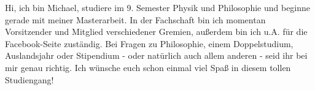 \begin{multicols*}{2}
{Hi, ich bin Michael, studiere im 9. Semester Physik und Philosophie und beginne gerade mit meiner Masterarbeit. In der Fachschaft bin ich momentan Vorsitzender und Mitglied verschiedener Gremien, außerdem bin ich u.A. für die Facebook-Seite zuständig. Bei Fragen zu Philosophie, einem Doppelstudium, Auslandsjahr oder Stipendium - oder natürlich auch allem anderen - seid ihr bei mir genau richtig. Ich wünsche euch schon einmal viel Spaß in diesem tollen Studiengang!}

\enlargethispage{\baselineskip}


\end{multicols*}
